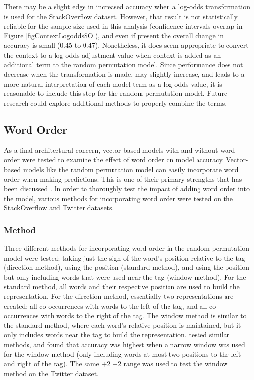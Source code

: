 \documentclass[man,floatsintext,donotrepeattitle]{apa6}
\newcommand{\numNoZero}[1]{{\sisetup{add-integer-zero=false}\num{#1}}}
\begin{document}
There may be a slight edge in increased accuracy when a log-odds transformation is used for the StackOverflow dataset.
However, that result is not statistically reliable for the sample size used in this analysis (confidence intervals overlap in Figure \ref{figContextLogoddsSO}),
and even if present the overall change in accuracy is small (\numNoZero{.45} to \numNoZero{.47}).
Nonetheless, it does seem appropriate to convert the context to a log-odds adjustment value when context is added as an additional term to the random permutation model.
Since performance does not decrease when the transformation is made, may slightly increase,
and leads to a more natural interpretation of each model term as a log-odds value, it is reasonable to include this step for the random permutation model.
Future research could explore additional methods to properly combine the terms.

\subsection{Word Order}

As a final architectural concern, vector-based models with and without word order were tested to examine the effect of word order on model accuracy.
Vector-based models like the random permutation model can easily incorporate word order when making predictions.
This is one of their primary strengths that has been discussed \parencites{Jones2007, Sahlgren2008}.
In order to thoroughly test the impact of adding word order into the model, various methods for incorporating word order were tested on the StackOverflow and Twitter datasets.

\subsubsection{Method}

Three different methods for incorporating word order in the random permutation model were tested:
taking just the sign of the word's position relative to the tag (direction method), using the position (standard method), and using the position but only including words that were used near the tag (window method).
For the standard method, all words and their respective position are used to build the representation.
For the direction method, essentially two representations are created: all co-occurrences with words to the left of the tag, and all co-occurrences with words to the right of the tag.
The window method is similar to the standard method, where each word's relative position is maintained, but it only includes words near the tag to build the representation.
\textcite{Sahlgren2008} tested similar methods, and found that accuracy was highest when a narrow window was used for the window method (only including words at most two positions to the left and right of the tag).
The same $+2$ $-2$ range was used to test the window method on the Twitter dataset.
\end{document}
